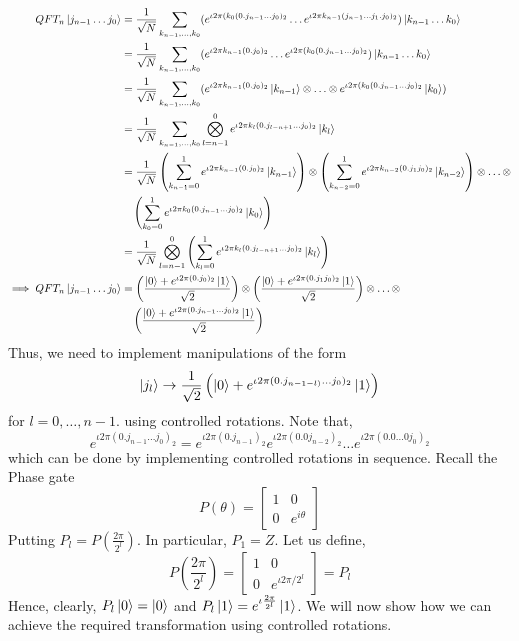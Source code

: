 \begin{align*}
    QFT_n\ket{j_{n-1}\ldots j_0} &=\frac{1}{\sqrt{N}}\sum_{k_{n-1},\ldots ,k_0}(e^{\iota 2\pi (k_0(0.j_{n-1}\ldots j_0)_2}\ldots e^{\iota 2\pi k_{n-1}(j_{n-1}\ldots j_1.j_0)_2})\ket{k_{n-1}\ldots k_0}\\
    &=\frac{1}{\sqrt{N}}\sum_{k_{n-1},\ldots ,k_0}(e^{\iota 2\pi k_{n-1}(0.j_0)_2}\ldots e^{\iota 2\pi (k_0(0.j_{n-1}\ldots j_0)_2})\ket{k_{n-1}\ldots k_0}\\
    &=\frac{1}{\sqrt{N}}\sum_{k_{n-1},\ldots ,k_0}(e^{\iota 2\pi k_{n-1}(0.j_0)_2}\ket{k_{n-1}}\otimes \ldots \otimes e^{\iota 2\pi (k_0(0.j_{n-1}\ldots j_0)_2}\ket{k_0})\\
    &=\frac{1}{\sqrt{N}}\sum_{k_{n-1},\ldots,k_0} \bigotimes_{l={n-1}}^0 e^{\iota 2 \pi k_l(0.j_{l-n+1}\ldots j_0)_2}\ket{k_l}\\
    &=\frac{1}{\sqrt{N}}\left(\sum_{k_{n-1}=0}^1 e^{\iota 2 \pi k_{n-1}(0.j_0)_2}\ket{k_{n-1}}\right)\otimes \left(\sum_{k_{n-2}=0}^1 e^{\iota 2 \pi k_{n-2} (0.j_1j_0)_2}\ket{k_{n-2}}\right) \otimes \ldots \otimes \\
    &\quad \left(\sum_{k_0=0}^1 e^{\iota 2 \pi k_0(0.j_{n-1}\ldots j_0)_2}\ket{k_0}\right)\\
    &=\frac{1}{\sqrt{N}} \bigotimes_{l={n-1}}^0 \left( \sum_{k_l=0}^1 e^{\iota 2 \pi k_l(0.j_{l-n+1}\ldots j_0)_2}\ket{k_l}\right)\\
    \implies QFT_n\ket{j_{n-1}\ldots j_0} &=\left(\frac{\ket{0}+e^{\iota 2 \pi (0.j_0)_2}\ket{1}}{\sqrt{2}}\right)\otimes \left(\frac{\ket{0}+e^{\iota 2 \pi (0.j_1j_0)_2}\ket{1}}{\sqrt{2}}\right) \otimes \ldots \otimes \\
    &\quad \left(\frac{\ket{0}+e^{\iota 2 \pi (0.j_{n-1}\ldots j_0)_2}\ket{1}}{\sqrt{2}}\right)
\end{align*}
Thus, we need to implement manipulations of the form
\[
\ket{j_l}\rightarrow \frac{1}{\sqrt{2}}\left(\ket{0}+e^{\iota 2 \pi (0.j_{n-1-l)}\ldots j_0)_2}\ket{1}\right)
\]
for $l=0,\ldots,n-1$.
using controlled rotations. Note that,
\[
e^{\iota 2 \pi (0.j_{n-1}\ldots j_0)_2}=e^{\iota 2\pi (0.j_{n-1})_2}e^{\iota 2 \pi (0.0j_{n-2})_2}\ldots e^{\iota 2 \pi (0.0\ldots 0j_0)_2}
\]
which can be done by implementing controlled rotations in sequence. Recall the Phase gate
\[
    P({\theta})=\begin{bmatrix}
        1 & 0 \\
        0 & e^{i\theta}
        \end{bmatrix}
\]
Putting $P_l=P(\frac{2\pi}{2^{l}})$. In particular, $P_1=Z$. Let us define,
\begin{equation}
P\left(\frac{2\pi}{2^{l}}\right) = \begin{bmatrix} 1 & 0 \\ 0 & e^{\iota 2\pi/2^{l}} \end{bmatrix}=P_l
\label{eq:phase_gate_defn}
\end{equation}
Hence, clearly, $P_l\ket{0}=\ket{0}$ and $P_l\ket{1}=e^{\iota \frac{2\pi}{2^{l}}}\ket{1}$. We will now show how we can achieve the required transformation using controlled rotations.
